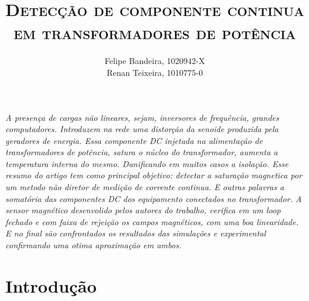 \documentclass[paper=a4, fontsize=11pt]{article}
\title{\textsc{Detecção de componente continua em transformadores de potência}}
\author{Felipe Bandeira, 1020942-X\\Renan Teixeira, 1010775-0}
\begin{document}
\maketitle

\textit{A presença de cargas não lineares, sejam, inversores de frequência, grandes computadores. Introduzem na rede uma distorção da senoide produzida pela geradores de energia. Essa componente DC injetada na alimentação de transformadores de potência, satura o núcleo do transformador, aumenta a temperatura interna do mesmo. Danificando em muitos casos a isolação. Esse resumo do artigo tem como principal objetivo: detectar a saturação magnetica por um metodo não diretor de medição de corrente continua. E outras palavras a somatória das componentes DC dos equipamento conectados no transformador. A sensor magnético desenvolido pelos autores do trabalho, verifica em um loop fechado e com faixa de rejeição os campos magnéticos, com uma boa linearidade. E no final são confrontados os resultados das simulações e experimental confirmando uma otima aproximação em ambos.}

\newpage

\tableofcontents

\newpage

\listoffigures


\newpage
\section{Introdução}
\end{document}
